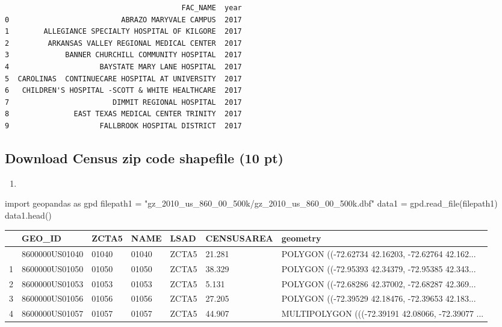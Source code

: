\documentclass[
  letterpaper,
  DIV=11,
  numbers=noendperiod]{scrartcl}
\newenvironment{Shaded}{\begin{snugshade}}{\end{snugshade}}
\newcommand{\ImportTok}[1]{\textcolor[rgb]{0.00,0.46,0.62}{#1}}
\newcommand{\NormalTok}[1]{\textcolor[rgb]{0.00,0.23,0.31}{#1}}
\newcommand{\OperatorTok}[1]{\textcolor[rgb]{0.37,0.37,0.37}{#1}}
\newcommand{\StringTok}[1]{\textcolor[rgb]{0.13,0.47,0.30}{#1}}
\providecommand{\tightlist}{%
  \setlength{\itemsep}{0pt}\setlength{\parskip}{0pt}}\usepackage{longtable,booktabs,array}
\begin{document}
\begin{verbatim}
                                         FAC_NAME  year
0                          ABRAZO MARYVALE CAMPUS  2017
1        ALLEGIANCE SPECIALTY HOSPITAL OF KILGORE  2017
2         ARKANSAS VALLEY REGIONAL MEDICAL CENTER  2017
3             BANNER CHURCHILL COMMUNITY HOSPITAL  2017
4                     BAYSTATE MARY LANE HOSPITAL  2017
5  CAROLINAS  CONTINUECARE HOSPITAL AT UNIVERSITY  2017
6   CHILDREN'S HOSPITAL -SCOTT & WHITE HEALTHCARE  2017
7                        DIMMIT REGIONAL HOSPITAL  2017
8               EAST TEXAS MEDICAL CENTER TRINITY  2017
9                     FALLBROOK HOSPITAL DISTRICT  2017
\end{verbatim}

\subsection{Download Census zip code shapefile (10
pt)}\label{download-census-zip-code-shapefile-10-pt}

\begin{enumerate}
\def\labelenumi{\arabic{enumi}.}
\tightlist
\item
\end{enumerate}

\begin{Shaded}
\begin{Highlighting}[]
\ImportTok{import}\NormalTok{ geopandas }\ImportTok{as}\NormalTok{ gpd}
\NormalTok{filepath1 }\OperatorTok{=} \StringTok{"gz\_2010\_us\_860\_00\_500k/gz\_2010\_us\_860\_00\_500k.dbf"}
\NormalTok{data1 }\OperatorTok{=}\NormalTok{ gpd.read\_file(filepath1)}
\NormalTok{data1.head()}
\end{Highlighting}
\end{Shaded}

\begin{longtable}[]{@{}lllllll@{}}
\toprule\noalign{}
& GEO\_ID & ZCTA5 & NAME & LSAD & CENSUSAREA & geometry \\
\midrule\noalign{}
\endhead
\bottomrule\noalign{}
\endlastfoot
0 & 8600000US01040 & 01040 & 01040 & ZCTA5 & 21.281 & POLYGON
((-72.62734 42.16203, -72.62764 42.162... \\
1 & 8600000US01050 & 01050 & 01050 & ZCTA5 & 38.329 & POLYGON
((-72.95393 42.34379, -72.95385 42.343... \\
2 & 8600000US01053 & 01053 & 01053 & ZCTA5 & 5.131 & POLYGON ((-72.68286
42.37002, -72.68287 42.369... \\
3 & 8600000US01056 & 01056 & 01056 & ZCTA5 & 27.205 & POLYGON
((-72.39529 42.18476, -72.39653 42.183... \\
4 & 8600000US01057 & 01057 & 01057 & ZCTA5 & 44.907 & MULTIPOLYGON
(((-72.39191 42.08066, -72.39077 ... \\
\end{longtable}
\end{document}
